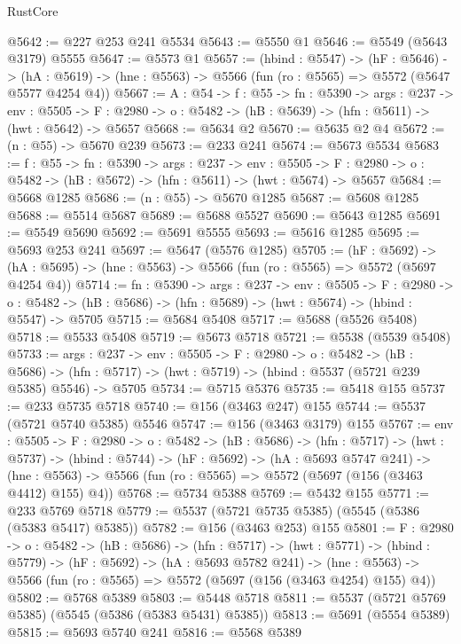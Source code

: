 \begin{lexlean}{RustCore}
\begin{coremodule}
@5642 := @227 @253 @241 @5534
@5643 := @5550 @1
@5646 := @5549 (@5643 @3179) @5555
@5647 := @5573 @1
@5657 := (hbind : @5547) ->
  (hF : @5646) ->
  (hA : @5619) -> (hne : @5563) -> @5566 (fun (ro : @5565) => @5572 (@5647 @5577 @4254 @4))
@5667 := {A : @54} ->
  {f : @55} ->
  {fn : @5390} ->
  {args : @237} ->
  {env : @5505} ->
  {F : @2980} -> {o : @5482} -> (hB : @5639) -> (hfn : @5611) -> (hwt : @5642) -> @5657
@5668 := @5634 @2
@5670 := @5635 @2 @4
@5672 := (n : @55) -> @5670 @239
@5673 := @233 @241
@5674 := @5673 @5534
@5683 := {f : @55} ->
  {fn : @5390} ->
  {args : @237} ->
  {env : @5505} ->
  {F : @2980} -> {o : @5482} -> (hB : @5672) -> (hfn : @5611) -> (hwt : @5674) -> @5657
@5684 := @5668 @1285
@5686 := (n : @55) -> @5670 @1285
@5687 := @5608 @1285
@5688 := @5514 @5687
@5689 := @5688 @5527
@5690 := @5643 @1285
@5691 := @5549 @5690
@5692 := @5691 @5555
@5693 := @5616 @1285
@5695 := @5693 @253 @241
@5697 := @5647 (@5576 @1285)
@5705 := (hF : @5692) ->
  (hA : @5695) -> (hne : @5563) -> @5566 (fun (ro : @5565) => @5572 (@5697 @4254 @4))
@5714 := {fn : @5390} ->
  {args : @237} ->
  {env : @5505} ->
  {F : @2980} ->
  {o : @5482} -> (hB : @5686) -> (hfn : @5689) -> (hwt : @5674) -> (hbind : @5547) -> @5705
@5715 := @5684 @5408
@5717 := @5688 (@5526 @5408)
@5718 := @5533 @5408
@5719 := @5673 @5718
@5721 := @5538 (@5539 @5408)
@5733 := {args : @237} ->
  {env : @5505} ->
  {F : @2980} ->
  {o : @5482} ->
  (hB : @5686) ->
  (hfn : @5717) -> (hwt : @5719) -> (hbind : @5537 (@5721 @239 @5385) @5546) -> @5705
@5734 := @5715 @5376
@5735 := @5418 @155
@5737 := @233 @5735 @5718
@5740 := @156 (@3463 @247) @155
@5744 := @5537 (@5721 @5740 @5385) @5546
@5747 := @156 (@3463 @3179) @155
@5767 := {env : @5505} ->
  {F : @2980} ->
  {o : @5482} ->
  (hB : @5686) ->
  (hfn : @5717) ->
  (hwt : @5737) ->
  (hbind : @5744) ->
  (hF : @5692) ->
  (hA : @5693 @5747 @241) ->
  (hne : @5563) -> @5566 (fun (ro : @5565) => @5572 (@5697 (@156 (@3463 @4412) @155) @4))
@5768 := @5734 @5388
@5769 := @5432 @155
@5771 := @233 @5769 @5718
@5779 := @5537 (@5721 @5735 @5385) (@5545 (@5386 (@5383 @5417) @5385))
@5782 := @156 (@3463 @253) @155
@5801 := {F : @2980} ->
  {o : @5482} ->
  (hB : @5686) ->
  (hfn : @5717) ->
  (hwt : @5771) ->
  (hbind : @5779) ->
  (hF : @5692) ->
  (hA : @5693 @5782 @241) ->
  (hne : @5563) -> @5566 (fun (ro : @5565) => @5572 (@5697 (@156 (@3463 @4254) @155) @4))
@5802 := @5768 @5389
@5803 := @5448 @5718
@5811 := @5537 (@5721 @5769 @5385) (@5545 (@5386 (@5383 @5431) @5385))
@5813 := @5691 (@5554 @5389)
@5815 := @5693 @5740 @241
@5816 := @5568 @5389

\end{coremodule}
\end{lexlean}
